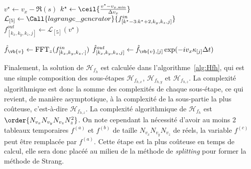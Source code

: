 \begin{itemize}
\begin{algorithm}
\begin{algorithmic}[1]
              \State $v^{\star} \gets v_x - \Re(s)$
              \State $k^{\star} \gets \ceil{\frac{ v^{\star}-v_{x,\text{min}} }{ \Delta v_x }}$
              \State $\mathcal{L}_{[5]} \gets \Call{lagrange\_generator}{f^{in}_{[k^\star-3:k^\star+2,k_y,k_z,j]}}$
              \State $f^{out}_{[k_x,k_y,k_z,j]} \gets \mathcal{L}_{[5]}( v^{\star} )$
            \EndFor
          \EndFor
        \EndFunction

          \vspace{0.25cm}

          \ForAll{$(k_x,k_y,k_z)\in[\![0,N_{v_x}[\![\times[\![0,N_{v_y}[\![\times[\![0,N_{v_z}[\![$}
            \State $\hat{f}_{\vb{v}} \gets \text{FFT}_z(f^{in}_{[k_x,k_y,k_z,\cdot]})$
              \State $\hat{f}^{out}_{[k_x,k_y,k_z,j]} \gets \hat{f}_{\vb{v},[j]}\exp(-iv_x\kappa_{[j]}\Delta t)$
            \EndFor
          \EndFor
        \EndFunction

          \vspace{0.25cm}

          \State {}
          \State {}
          \State {}
        \EndFunction
      \end{algorithmic}
    \end{algorithm}
\end{itemize}

Finalement, la solution de $\mathcal{H}_{f_h}$ est calculée dans l'algorithme~\ref{alg:Hfh}, qui est une simple composition des sous-étapes $\mathcal{H}_{f_{h,x}}$, $\mathcal{H}_{f_{h,y}}$ et $\mathcal{H}_{f_{h,z}}$. La complexité algorithmique est donc la somme des complexités de chaque sous-étape, ce qui revient, de manière asymptotique, à la complexité de la sous-partie la plus coûteuse, c'est-à-dire $\mathcal{H}_{f_{h,z}}$. La complexité algorithmique de $\mathcal{H}_{f_h}$ est $\order{N_{v_x}N_{v_y}N_{v_z}N_z^2}$. On note cependant la nécessité d'avoir au moins 2 tableaux temporaires $f^{(a)}$ et $f^{(b)}$ de taille $N_{v_x}N_{v_y}N_{v_z}$ de réels, la variable $f^{(c)}$ peut être remplacée par $f^{(a)}$. Cette étape est la plus coûteuse en temps de calcul, elle sera donc placéé au milieu de la méthode de \emph{splitting} pour former la méthode de Strang.

